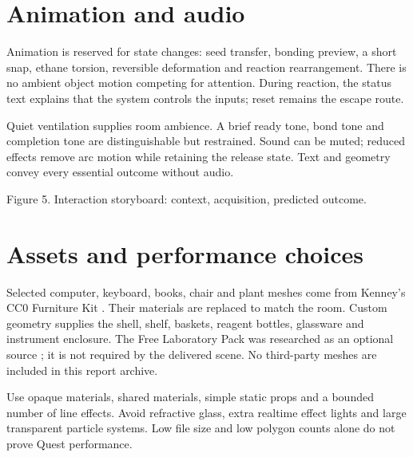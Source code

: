 \section*{Animation and audio}
Animation is reserved for state changes: seed transfer, bonding preview, a short snap, ethane torsion, reversible deformation and reaction rearrangement. There is no ambient object motion competing for attention. During reaction, the status text explains that the system controls the inputs; reset remains the escape route.

Quiet ventilation supplies room ambience. A brief ready tone, bond tone and completion tone are distinguishable but restrained. Sound can be muted; reduced effects remove arc motion while retaining the release state. Text and geometry convey every essential outcome without audio.

\begin{center}
\par\small Figure 5. Interaction storyboard: context, acquisition, predicted outcome.
\end{center}

\section*{Assets and performance choices}
Selected computer, keyboard, books, chair and plant meshes come from Kenney's CC0 Furniture Kit \cite{kenney}. Their materials are replaced to match the room. Custom geometry supplies the shell, shelf, baskets, reagent bottles, glassware and instrument enclosure. The Free Laboratory Pack was researched as an optional source \cite{freelab}; it is not required by the delivered scene. No third-party meshes are included in this report archive.

Use opaque materials, shared materials, simple static props and a bounded number of line effects. Avoid refractive glass, extra realtime effect lights and large transparent particle systems. Low file size and low polygon counts alone do not prove Quest performance.

